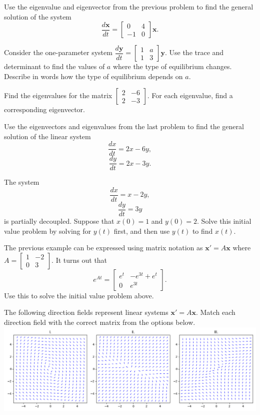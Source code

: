 \documentclass[11pt]{exam}
\begin{document}
\begin{questions}
\question Use the eigenvalue and eigenvector from the previous problem to find the general solution of the system
$$\dfrac{d\mathbf{x}}{dt} = \begin{bmatrix} 0 & 4 \\ -1 & 0 \end{bmatrix} \mathbf{x}.$$

\vfill

\question Consider the one-parameter system $\dfrac{d\mathbf{y}}{dt} = \begin{bmatrix} 1 & a \\ 1 & 3 \end{bmatrix} \mathbf{y}$. Use the trace and determinant to find the values of $a$ where the type of equilibrium changes.  Describe in words how the type of equilibrium depends on $a$. 
\vfill

\newpage
\question Find the eigenvalues for the matrix $\begin{bmatrix} 2 & -6 \\ 2 & -3 \end{bmatrix}$.  For each eigenvalue, find a corresponding eigenvector. 
\vfill

\question Use the eigenvectors and eigenvalues from the last problem to find the general solution of the linear system
$$\dfrac{dx}{dt} = 2x - 6y,$$
$$\dfrac{dy}{dt} = 2x - 3y.$$
\vfill


\question The system 
$$\dfrac{dx}{dt} = x - 2y,$$
$$\dfrac{dy}{dt} = 3y$$
is partially decoupled. Suppose that $x(0) = 1$ and $y(0) = 2$.  Solve this initial value problem by solving for $y(t)$ first, and then use $y(t)$ to find $x(t)$.  
\vfill

\question The previous example can be expressed using matrix notation as $\mathbf{x}' = A \mathbf{x}$ where $A = \begin{bmatrix} 1 & -2 \\ 0 & 3 \end{bmatrix}$.  It turns out that 
$$e^{At} = \left[\begin{matrix}e^{t} & - e^{3 t} + e^{t}\\0 & e^{3 t}\end{matrix}\right].$$
Use this to solve the initial value problem above. 
\vfill

\newpage
\question The following direction fields represent linear systems $\mathbf{x}' = A\mathbf{x}$.  Match each direction field with the correct matrix from the options below. \\
\includegraphics[scale=0.55]{reviewDirectionFields.png}


\end{questions}
\end{document}
